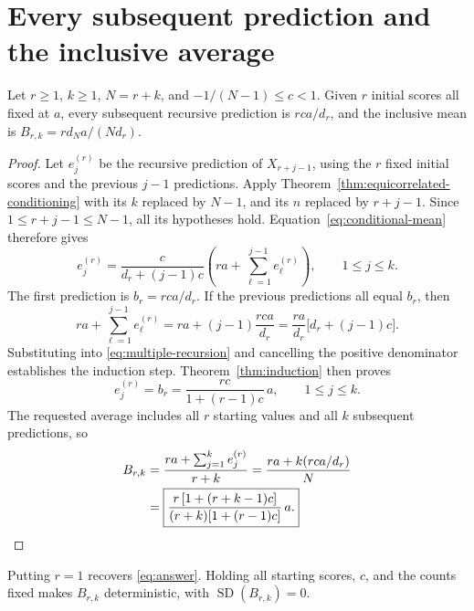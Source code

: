 \section{Every subsequent prediction and the inclusive average}
\begin{theorem}
\label{thm:multiple-mean}
Let \(r\geq1\), \(k\geq1\), \(N=r+k\), and
\(-1/(N-1)\leq c<1\). Given \(r\) initial scores all fixed at \(a\),
every subsequent recursive prediction is \(rca/d_r\), and the inclusive
mean is \(B_{r,k}=r d_N a/(N d_r)\).
\end{theorem}
\begin{proof}
Let \(e_j^{(r)}\) be the recursive prediction of \(X_{r+j-1}\), using the
\(r\) fixed initial scores and the previous \(j-1\) predictions.
Apply Theorem~\ref{thm:equicorrelated-conditioning} with its \(k\) replaced
by \(N-1\), and its \(n\) replaced by \(r+j-1\). Since
\(1\leq r+j-1\leq N-1\), all its hypotheses hold.
Equation~\eqref{eq:conditional-mean} therefore gives
\begin{equation}
  e_j^{(r)}=\frac{c}{d_r+(j-1)c}
       \left(ra+\sum_{\ell=1}^{j-1}e_\ell^{(r)}\right),
  \qquad 1\leq j\leq k.
  \label{eq:multiple-recursion}
\end{equation}
The first prediction is \(b_r=rca/d_r\). If the previous predictions all
equal \(b_r\), then
\[
  ra+\sum_{\ell=1}^{j-1}e_\ell^{(r)}
  =ra+(j-1)\frac{rca}{d_r}
  =\frac{ra}{d_r}\bigl[d_r+(j-1)c\bigr].
\]
Substituting into \eqref{eq:multiple-recursion} and cancelling the positive
denominator establishes the induction step. Theorem~\ref{thm:induction}
then proves
\begin{equation}
  \boxed{e_j^{(r)}=b_r=\frac{rc}{1+(r-1)c}\,a,
  \qquad 1\leq j\leq k.}
  \label{eq:multiple-predictions}
\end{equation}
The requested average includes all \(r\) starting values and all \(k\)
subsequent predictions, so
\begin{align}
  B_{r,k}
  &=\frac{ra+\sum_{j=1}^{k}e_j^{(r)}}{r+k}
   =\frac{ra+k(rca/d_r)}{N}\notag\\
  &=\boxed{\frac{r\,[1+(r+k-1)c]}{(r+k)[1+(r-1)c]}\,a.}
  \label{eq:multiple-mean}
\end{align}
\end{proof}
Putting \(r=1\) recovers \eqref{eq:answer}. Holding all starting scores,
\(c\), and the counts fixed makes \(B_{r,k}\) deterministic, with
\(\operatorname{SD}(B_{r,k})=0\).

